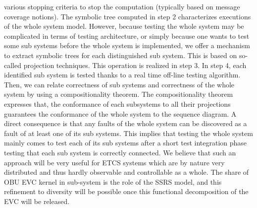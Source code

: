 various stopping criteria to stop the computation (typically based on
message coverage notions).  The symbolic tree computed in step 2
characterizes executions of the whole system model.  However, because
testing the whole system may be complicated in terms of testing
architecture, or simply because one wants to test some sub systems
before the whole system is implemented, we offer a mechanism to
extract symbolic trees for each distinguished sub system. This is
based on so-called projection techniques. This operation is realized
in step 3. In step 4, each identified sub system is tested thanks to a
real time off-line testing algorithm.  Then, we can relate correctness
of sub systems and correctness of the whole system by using a
compositionality theorem.  The compositionality theorem expresses
that, the conformance of each subsystems to all their projections
guarantees the conformance of the whole system to the sequence
diagram. A direct consequence is that any faults of the whole system
can be discovered as a fault of at least one of its sub systems. This
implies that testing the whole system mainly comes to test each of its
sub systems after a short test integration phase testing that each sub
system is correctly connected.  We believe that such an approach will
be very useful for ETCS systems which are by nature very distributed
and thus hardly observable and controllable as a whole. The share of
OBU EVC kernel in sub-system is the role of the SSRS model, and this
refinement to diversity will be possible once this functional
decomposition of the EVC will be released.

